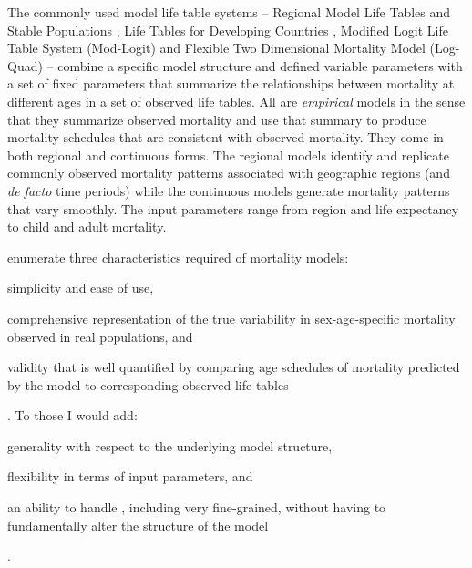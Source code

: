 \documentclass[11pt]{article}
\begin{document}
The commonly used model life table systems -- Regional Model Life Tables and Stable Populations \citep{coale1966}, Life Tables for Developing Countries \citep{united1982model}, Modified Logit Life Table System (Mod-Logit) \citep{murray2003, Wang2013} and Flexible Two Dimensional Mortality Model (Log-Quad) \citep{wilmoth2012flexible} -- combine a specific model structure and defined variable parameters with a set of fixed parameters that summarize the relationships between mortality at different ages in a set of observed life tables.  All are \emph{empirical} models in the sense that they summarize observed mortality and use that summary to produce  mortality schedules that are consistent with observed mortality.  They come in both regional and continuous forms. 
{The regional models identify and replicate commonly observed mortality patterns associated with geographic regions (and \textit{de facto} time periods) while the continuous models generate mortality patterns that vary smoothly. The input parameters range from region and life expectancy to child and adult mortality.} 

\cite{murray2003} enumerate three characteristics required of mortality models: 
\begin{enumerate*}[label=\arabic*)]
\item simplicity and ease of use,
\item comprehensive representation of the true variability in sex-age-specific mortality observed in real populations, and
\item validity that is well quantified by comparing age schedules of mortality predicted by the model to corresponding observed life tables
\end{enumerate*}.
To those I would add:
\begin{enumerate*}[label=\arabic*)]
\item generality with respect to the underlying model structure, 
\item flexibility in terms of input parameters, and 
\item an ability to handle , including very fine-grained,  without having to fundamentally alter the structure of the model
\end{enumerate*}. 
\end{document}
